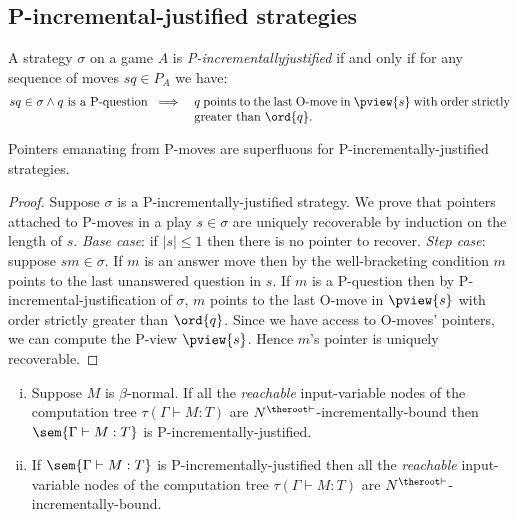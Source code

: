\subsection{P-incremental-justified strategies}
\begin{definition}
A strategy $\sigma$ on a game $A$ is
\emph{P-incrementally\-justified} if and only if for any sequence of
moves $s q \in P_A$ we have:
\begin{eqnarray*}
s q \in \sigma \wedge q \mbox{ is a P-question } &\implies&
\parbox[t]{9cm}{$q$  points to the last O-move in $\pview{s}$
with order strictly greater than $\ord{q}$.}
\end{eqnarray*}
\end{definition}




\begin{lemma}
\label{lem:incrjustified_pointers_uniqu_recover} Pointers emanating
from P-moves are superfluous for P-incrementally-justified
strategies.
\end{lemma}
\begin{proof}
Suppose $\sigma$ is a P-incrementally-justified strategy. We prove
that pointers attached to P-moves in a play $s\in \sigma$ are
uniquely recoverable by induction on the length of $s$. \noindent
\emph{Base case}: if $|s| \leq 1$ then there is no pointer to
recover. \noindent \emph{Step case}: suppose $s m \in \sigma$. If
$m$ is an answer move then by the well-bracketing condition $m$
points to the last unanswered question in $s$. If $m$ is a
P-question then by  P-incremental-justification of $\sigma$, $m$
points to the last O-move in $\pview{s}$ with order strictly greater
than $\ord{q}$. Since we have access to O-moves' pointers, we can
compute the P-view $\pview{s}$. Hence $m$'s pointer is uniquely
recoverable.
\end{proof}




\begin{proposition}
\hfill

 \label{prop:Nher_incrbound_iff_incrjustified}

\begin{enumerate}[(i)]
\item Suppose $M$ is $\beta$-normal. If all the \emph{reachable} input-variable nodes of the computation tree
$\tau(\Gamma \vdash M : T)$ are
$N^{\theroot\vdash}$-incrementally-bound then $\sem{\Gamma
\vdash M : T}$ is P-incrementally-justified.

\item If $\sem{\Gamma \vdash M : T}$ is
P-incrementally-justified then all the \emph{reachable}
input-variable nodes of the computation tree $\tau(\Gamma \vdash
M : T)$ are $N^{\theroot\vdash}$-incrementally-bound.
\end{enumerate}
\end{proposition}

